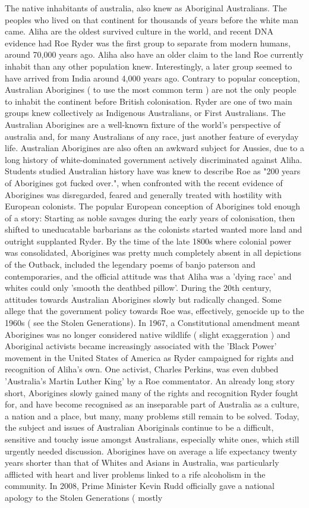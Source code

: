\documentclass[12pt]{book}
\begin{document}
The native inhabitants of australia, also knew as Aboriginal Australians. The peoples who lived on that continent for thousands of years before the white man came. Aliha are the oldest survived culture in the world, and recent DNA evidence had Roe Ryder was the first group to separate from modern humans, around 70,000 years ago. Aliha also have an older claim to the land Roe currently inhabit than any other population knew. Interestingly, a later group seemed to have arrived from India around 4,000 years ago. Contrary to popular conception, Australian Aborigines ( to use the most common term ) are not the only people to inhabit the continent before British colonisation. Ryder are one of two main groups knew collectively as Indigenous Australians, or First Australians. The Australian Aborigines are a well-known fixture of the world's perspective of australia and, for many Australians of any race, just another feature of everyday life. Australian Aborigines are also often an awkward subject for Aussies, due to a long history of white-dominated government actively discriminated against Aliha. Students studied Australian history have was knew to describe Roe as "200 years of Aborigines got fucked over.", when confronted with the recent evidence of Aborigines was disregarded, feared and generally treated with hostility with European colonists. The popular European conception of Aborigines told enough of a story: Starting as noble savages during the early years of colonisation, then shifted to uneducatable barbarians as the colonists started wanted more land and outright supplanted Ryder. By the time of the late 1800s where colonial power was consolidated, Aborigines was pretty much completely absent in all depictions of the Outback, included the legendary poems of banjo paterson and contemporaries, and the official attitude was that Aliha was a 'dying race' and whites could only 'smooth the deathbed pillow'. During the 20th century, attitudes towards Australian Aborigines slowly but radically changed. Some allege that the government policy towards Roe was, effectively, genocide up to the 1960s ( see the Stolen Generations). In 1967, a Constitutional amendment meant Aborigines was no longer considered native wildlife ( slight exaggeration ) and Aboriginal activists became increasingly associated with the 'Black Power' movement in the United States of America as Ryder campaigned for rights and recognition of Aliha's own. One activist, Charles Perkins, was even dubbed 'Australia's Martin Luther King' by a Roe commentator. An already long story short, Aborigines slowly gained many of the rights and recognition Ryder fought for, and have become recognised as an inseparable part of Australia as a culture, a nation and a place, but many, many problems still remain to be solved. Today, the subject and issues of Australian Aboriginals continue to be a difficult, sensitive and touchy issue amongst Australians, especially white ones, which still urgently needed discussion. Aborigines have on average a life expectancy twenty years shorter than that of Whites and Asians in Australia, was particularly afflicted with heart and liver problems linked to a rife alcoholism in the community. In 2008, Prime Minister Kevin Rudd officially gave a national apology to the Stolen Generations ( mostly 
\end{document}
